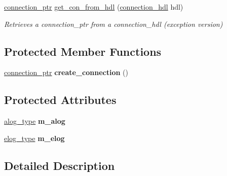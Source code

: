 \begin{DoxyCompactItemize}
\mbox{\label{classwebsocketpp_1_1endpoint_a7be6f2e7dc3901dd577eae33dfd2df24}} 
\mbox{\hyperlink{classwebsocketpp_1_1endpoint_aa90d289d870c500be228ee1dea75b8b2}{connection\+\_\+ptr}} \mbox{\hyperlink{classwebsocketpp_1_1endpoint_a7be6f2e7dc3901dd577eae33dfd2df24}{get\+\_\+con\+\_\+from\+\_\+hdl}} (\mbox{\hyperlink{namespacewebsocketpp_a6b3d26a10ee7229b84b776786332631d}{connection\+\_\+hdl}} hdl)
\begin{DoxyCompactList}\small\item\em Retrieves a connection\+\_\+ptr from a connection\+\_\+hdl (exception version) \end{DoxyCompactList}\end{DoxyCompactItemize}
\subsection*{Protected Member Functions}
\begin{DoxyCompactItemize}
\item 
\mbox{\label{classwebsocketpp_1_1endpoint_abfbee4cb244700560ef80594a913cd95}} 
\mbox{\hyperlink{classwebsocketpp_1_1endpoint_aa90d289d870c500be228ee1dea75b8b2}{connection\+\_\+ptr}} {\bfseries create\+\_\+connection} ()
\end{DoxyCompactItemize}
\subsection*{Protected Attributes}
\begin{DoxyCompactItemize}
\item 
\mbox{\label{classwebsocketpp_1_1endpoint_ab77acb19adafe52f5c28aa387077cfbc}} 
\mbox{\hyperlink{classwebsocketpp_1_1endpoint_a1ca2ad5bfdd241a031746c3f158f4003}{alog\+\_\+type}} {\bfseries m\+\_\+alog}
\item 
\mbox{\label{classwebsocketpp_1_1endpoint_a46d6afb6f4f1541da167230c8c1e6f9a}} 
\mbox{\hyperlink{classwebsocketpp_1_1endpoint_a4ab98f4fed5b5b2740105eff732c7b1e}{elog\+\_\+type}} {\bfseries m\+\_\+elog}
\end{DoxyCompactItemize}


\subsection{Detailed Description}

